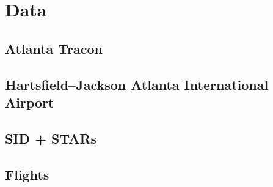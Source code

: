 \chapter{Data}
\section{Atlanta Tracon}
\section{Hartsfield–Jackson Atlanta International Airport}
\section{SID + STARs}
\section{Flights}